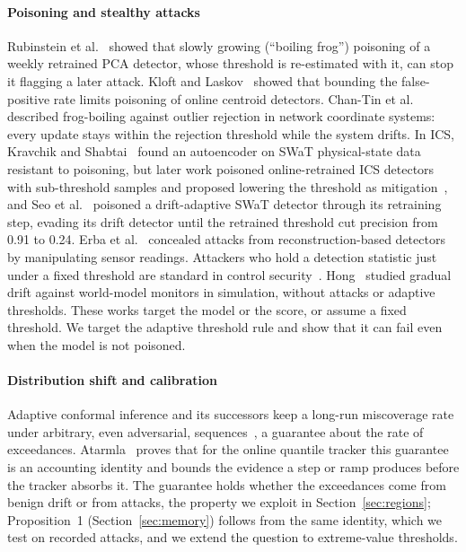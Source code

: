 \documentclass[sigconf]{acmart}
\begin{document}
\paragraph{Poisoning and stealthy attacks}
Rubinstein et al.~\cite{rubinstein2009antidote} showed that slowly growing (``boiling frog'') poisoning
of a weekly retrained PCA detector, whose threshold is re-estimated with it, can stop it flagging a
later attack. Kloft and Laskov~\cite{kloft2010online, kloft2012security} showed that bounding the
false-positive rate limits poisoning of online centroid detectors. Chan-Tin et
al.~\cite{chantin2009frog, chantin2011frog} described frog-boiling against outlier rejection in network
coordinate systems: every update stays within the rejection threshold while the system drifts. In ICS,
Kravchik and Shabtai~\cite{kravchik2020frog} found an autoencoder on SWaT physical-state data resistant
to poisoning, but later work poisoned online-retrained ICS detectors with sub-threshold samples and
proposed lowering the threshold as mitigation~\cite{kravchik2021poisoning}, and Seo
et al.~\cite{seo2026retraining} poisoned a drift-adaptive SWaT detector through its retraining step,
evading its drift detector until the retrained threshold cut precision from 0.91 to 0.24. Erba
et al.~\cite{erba2020concealment} concealed attacks from reconstruction-based detectors by manipulating
sensor readings. Attackers who hold a detection statistic just under a fixed threshold are standard in
control security~\cite{cardenas2011process, urbina2016stealthy}. Hong~\cite{hong2026boiling} studied
gradual drift against world-model monitors in simulation, without attacks or adaptive thresholds. These
works target the model or the score, or assume a fixed threshold. We target the adaptive threshold rule
and show that it can fail even when the model is not poisoned.

\paragraph{Distribution shift and calibration}
Adaptive conformal inference and its successors keep a long-run miscoverage rate under arbitrary, even
adversarial, sequences~\cite{gibbs2021aci, bastani2022multivalid}, a guarantee about the rate of
exceedances. Atarmla~\cite{atarmla2026price} proves that for the online quantile tracker this guarantee
is an accounting identity and bounds the evidence a step or ramp produces before the tracker absorbs
it. The guarantee holds whether the exceedances come from benign drift or from attacks, the property we
exploit in Section~\ref{sec:regions}; Proposition~1 (Section~\ref{sec:memory}) follows from the same
identity, which we test on recorded attacks, and we extend the question to extreme-value thresholds.
\end{document}
